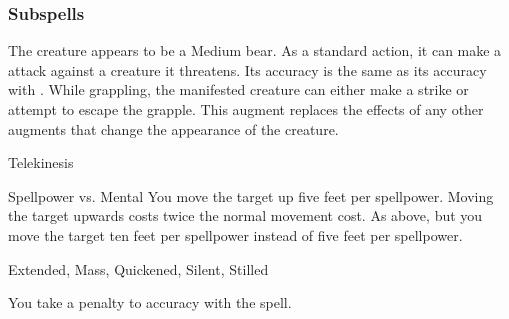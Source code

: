\subsubsection{Subspells}
The creature appears to be a Medium bear.
As a standard action, it can make a  attack against a creature it threatens.
Its accuracy is the same as its accuracy with .
While grappling, the manifested creature can either make a strike or attempt to escape the grapple.
This augment replaces the effects of any other augments that change the appearance of the creature.
\begin{spellsection}{Telekinesis}
\begin{spellcontent}
\begin{spelltargetinginfo}
\end{spelltargetinginfo}
\begin{spelleffects}
\begin{spellattack}{Spellpower vs. Mental}
\spellsuccess
You move the target up five feet per spellpower. Moving the target upwards costs twice the normal movement cost.
\spellcritical
As above, but you move the target ten feet per spellpower instead of five feet per spellpower.
\end{spellattack}
\end{spelleffects}
\end{spellcontent}
\begin{spellfooter}
 Extended, Mass, Quickened, Silent, Stilled
\end{spellfooter}
\begin{spellsubcontent}
\begin{spellcantrip}
You take a  penalty to accuracy with the spell.
\end{spellcantrip}
\end{spellsubcontent}
\end{spellsection}
